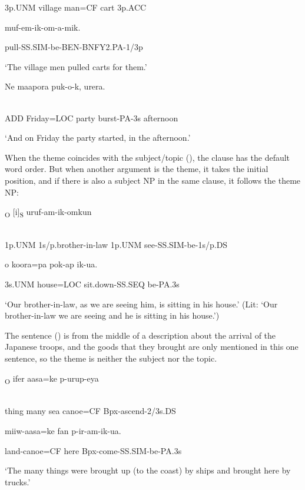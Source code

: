 3p.UNM  village  man=CF  cart  3p.ACC  

muf-em-ik-om-a-mik.

pull-SS.SIM-be-BEN-BNFY2.PA-1/3p

`The village men pulled carts for them.'

\ea%
\label{ex:x1698}
\gll Ne    maapora  puk-o-k,  urera.  \\
      \\
\glt
\z

ADD  Friday=LOC  party  burst-PA-3s  afternoon

`And on Friday the party started, in the afternoon.'

When the theme coincides with the subject/topic (), the clause has the default word order. But when another argument is the theme, it takes the initial position, and if there is also a subject NP in the same clause, it follows the theme  NP: 

\ea%
\label{ex:x1473}
\textsubscript{O}  [i]\textsubscript{S}  uruf-am-ik-omkun \\
      \\
\glt
\z

1p.UNM  1s/p.brother-in-law  1p.UNM  see-SS.SIM-be-1s/p.DS

o  koora=pa  pok-ap  ik-ua.

3s.UNM  house=LOC  sit.down-SS.SEQ  be-PA.3s

`Our brother-in-law, as we are seeing him, is sitting in his house.' (Lit: `Our brother-in-law we are seeing and he is sitting in his house.')

The sentence () is from the middle of a description about the arrival of the Japanese troops, and the goods that they brought are only mentioned in this one sentence, so the theme is neither the subject nor the topic. 

\ea%
\label{ex:x1701}
\textsubscript{O}  ifer  aasa=ke  p-urup-eya  \\
      \\
\glt
\z

thing  many  sea  canoe=CF  Bpx-ascend-2/3s.DS

miiw-aasa=ke  fan  p-ir-am-ik-ua.

land-canoe=CF  here  Bpx-come-SS.SIM-be-PA.3s

`The many things were brought up (to the coast) by ships and brought here by trucks.'

